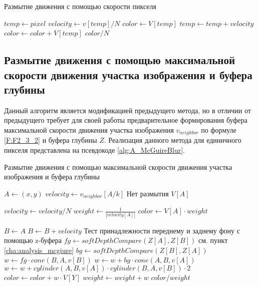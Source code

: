\begin{breakablealgorithm}
    \caption{Размытие движения с помощью скорости пикселя} \label{alg:A_PerPixelBlur}
    \begin{algorithmic}[1]
            \State $temp \leftarrow pixel$
            \State $velocity \leftarrow v[temp] / N$
            \State $color \leftarrow V[temp]$
            \ForAll{$i \in [0; N)$}
                \State $temp \leftarrow temp + velocity$
                \State $color \leftarrow color + V[temp]$
            \EndFor
            \State \Return $color / N$
        \EndFunction
\end{algorithmic}
\end{breakablealgorithm}




\subsection{Размытие движения с помощью максимальной скорости движения участка изображения и буфера глубины}

Данный алгоритм является модификацией предыдущего метода, но в отличии от предыдущего требует для своей работы предварительное формирования буфера максимальной скорости движения участка изображения $v_{neighbor}$ по формуле \eqref{F:F2_3_2} и буфера глубины $Z$. Реализация данного метода для единичного пикселя представлена на псевдокоде \ref{alg:A_McGuireBlur}.

\begin{breakablealgorithm}
\caption{Размытие движения с помощью максимальной скорости движения участка изображения и буфера глубины} \label{alg:A_McGuireBlur}
\begin{algorithmic}[1]
        \State $A \leftarrow (x,y)$
        \State $velocity \leftarrow v_{neighbor}[A/k]$
         \Comment Нет размытия 
            \State \Return $V[A]$
        \EndIf
        
        \State $velocity \leftarrow velocity / N$
        \State $weight \leftarrow \frac{1}{|velocity[A]|}$
        \State $color \leftarrow V[A] \cdot weight$
        
        \State $B \leftarrow A$
        \ForAll{$i \in [0; N)$}
            \State $B \leftarrow B + velocity$
            \Statex \Comment Тест принадлежности переднему и заднему фону с помощью z-буфера
            \State $fg \leftarrow softDepthCompare(Z[A],Z[B])$  \Comment см. пункт \ref{cha:analysis_mcgiure} 
            \State $bg \leftarrow softDepthCompare(Z[B],Z[A])$
            \Statex
            \State $w \leftarrow  fg \cdot cone(B,A,v[B])$
            \State $w \leftarrow  w + bg \cdot cone(A,B,v[A])$
            \State $w \leftarrow  w + cylinder(A,B,v[A]) \cdot  cylinder(B,A,v[B]) \cdot 2$
            \Statex
            \State $color \leftarrow color + w \cdot V[Y]$
            \State $weight \leftarrow weight + w$
        \EndFor
        \State \Return $color / weight$
    \EndFunction        
\end{algorithmic}
\end{breakablealgorithm}



